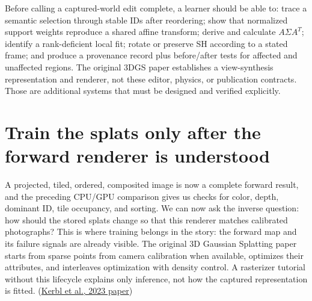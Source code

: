 Before calling a captured-world edit complete, a learner should be able to: trace a semantic selection through stable IDs after reordering; show that normalized support weights reproduce a shared affine transform; derive and calculate \(A\Sigma A^T\); identify a rank-deficient local fit; rotate or preserve SH according to a stated frame; and produce a provenance record plus before/after tests for affected and unaffected regions. The original 3DGS paper establishes a view-synthesis representation and renderer, not these editor, physics, or publication contracts. Those are additional systems that must be designed and verified explicitly.

\section{Train the splats only after the forward renderer is understood}\label{04-visual-computing-ii-ch039-train-the-splats-only-after-the-forward-renderer-is-understood}

\hypertarget{04-visual-computing-ii-ch039-train-the-splats-only-after-the-forward-renderer-is-understood}{}

A projected, tiled, ordered, composited image is now a complete forward result, and the preceding CPU/GPU comparison gives us checks for color, depth, dominant ID, tile occupancy, and sorting. We can now ask the inverse question: how should the stored splats change so that this renderer matches calibrated photographs? This is where training belongs in the story: the forward map and its failure signals are already visible. The original 3D Gaussian Splatting paper starts from sparse points from camera calibration when available, optimizes their attributes, and interleaves optimization with density control. A rasterizer tutorial without this lifecycle explains only inference, not how the captured representation is fitted. (\href{https://arxiv.org/abs/2308.04079}{Kerbl et al., 2023 paper})

